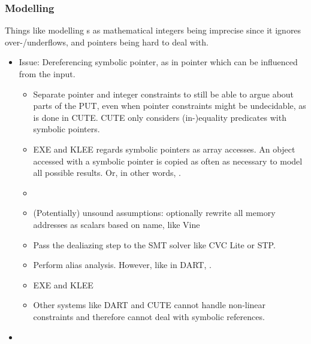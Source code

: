 \documentclass{article}
\begin{document}
\subsubsection{Modelling}
Things like modelling s as mathematical integers being imprecise since it ignores over-/underflows, and pointers being hard to deal with.
\begin{itemize}
  \item Issue: Dereferencing symbolic pointer, as in pointer which can be influenced from the input.
        \begin{itemize}
          \item Separate pointer and integer constraints to still be able to argue about parts of the PUT, even when pointer constraints might be undecidable, as is done in CUTE\cite{CUTE}. CUTE only considers (in-)equality predicates with symbolic pointers.
          \item EXE\cite{EXE} and KLEE\cite{KLEE} regards symbolic pointers as array accesses. An object accessed with a symbolic pointer is copied as often as necessary to model all possible results. Or, in other words, \cite{AllYouEverWanted}.
          \item {}\cite{AllYouEverWanted}
          \item (Potentially) unsound assumptions: optionally rewrite all memory addresses as scalars based on name, like Vine\cite{BitBlaze}
          \item Pass the dealiazing step to the SMT solver like CVC Lite\cite{CVCLite} or STP\cite{STP}.
          \item Perform alias analysis. However, like in DART\cite{DART}, \cite{AllYouEverWanted}.
          \item EXE\cite{EXE} and KLEE\cite{KLEE} \cite{AllYouEverWanted}
          \item Other systems like DART\cite{DART} and CUTE\cite{CUTE} cannot handle non-linear constraints and therefore cannot deal with symbolic references.
        \end{itemize}
  \item {}\cite{ReviewThreeDecades}
\end{itemize}
\end{document}
